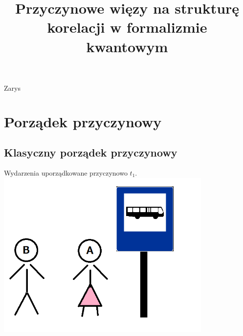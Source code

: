 \documentclass{beamer}
\title[] %
{Przyczynowe więzy na strukturę korelacji w formalizmie
kwantowym}
\author[Piotr Krasuń]
{}
\institute[Politechnika Gdańska] %
{
Politechnika Gdańska \\
  Wydział Fizyki Technicznej i Matematyki Stosowanej
}
\begin{document}
\begin{frame}
  \titlepage
\end{frame}

\begin{frame}{Zarys}
  \tableofcontents
\end{frame}





\section{Porządek przyczynowy}

\subsection{Klasyczny porządek przyczynowy}

\begin{frame}{Wydarzenia uporządkowane przyczynowo $t_1$.}
\centering
\includegraphics[width=0.8\textwidth]{obrazki/pAB}
\end{frame}
\end{document}
